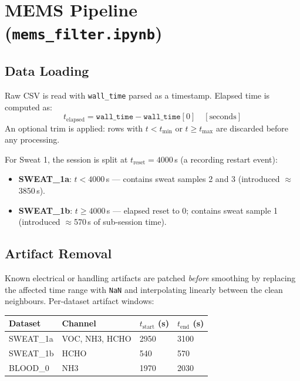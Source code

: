 \documentclass[11pt,a4paper]{article}
\begin{document}
\section{MEMS Pipeline (\texttt{mems\_filter.ipynb})}

\subsection{Data Loading}

Raw CSV is read with \texttt{wall\_time} parsed as a timestamp.
Elapsed time is computed as:
\[
  t_{\text{elapsed}} = \texttt{wall\_time} - \texttt{wall\_time}[0] \quad [\text{seconds}]
\]
An optional trim is applied: rows with $t < t_{\min}$ or $t \geq t_{\max}$ are
discarded before any processing.

For Sweat 1, the session is split at $t_{\text{reset}} = 4000$\,s (a recording
restart event):
\begin{itemize}
  \item \textbf{SWEAT\_1a}: $t < 4000$\,s --- contains sweat samples 2 and 3
        (introduced $\approx$3850\,s).
  \item \textbf{SWEAT\_1b}: $t \geq 4000$\,s --- elapsed reset to 0; contains
        sweat sample 1 (introduced $\approx$570\,s of sub-session time).
\end{itemize}

\subsection{Artifact Removal}

Known electrical or handling artifacts are patched \emph{before} smoothing by
replacing the affected time range with \texttt{NaN} and interpolating linearly
between the clean neighbours.  Per-dataset artifact windows:

\begin{center}
\begin{tabular}{llll}
\toprule
Dataset & Channel & $t_{\text{start}}$ (s) & $t_{\text{end}}$ (s) \\
\midrule
SWEAT\_1a & VOC, NH3, HCHO & 2950 & 3100 \\
SWEAT\_1b & HCHO           &  540 &  570 \\
BLOOD\_0  & NH3            & 1970 & 2030 \\
\bottomrule
\end{tabular}
\end{center}
\end{document}
